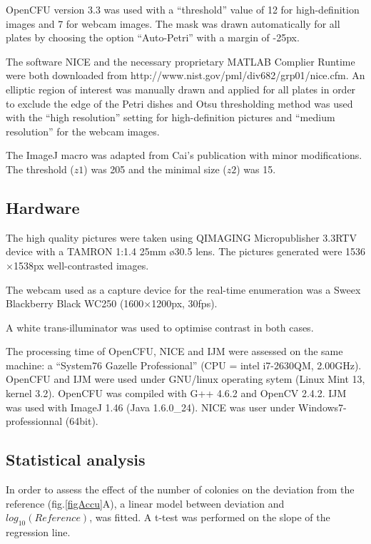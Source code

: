 \documentclass[10pt]{article}
\newcommand{\IJM}{IJM}
\begin{document}
OpenCFU version 3.3 was used with a ``threshold'' value of 12 for high-definition images and 7 for webcam images.
The mask was drawn automatically for all plates by choosing the option ``Auto-Petri'' with a margin of -25px. 

The software NICE and the necessary proprietary MATLAB Complier Runtime were both downloaded from
http://www.nist.gov/pml/div682/grp01/nice.cfm.
An elliptic region of interest was manually drawn and applied for all plates
in order to exclude the edge of the Petri dishes and Otsu thresholding method
was used with the ``high resolution'' setting for high-definition pictures and ``medium resolution'' for the webcam images.

The ImageJ macro was adapted from Cai's publication\cite{cai_optimized_2011} with minor modifications.\\
The threshold ($z1$) was 205 and the minimal size ($z2$) was 15.


\subsection*{Hardware} 
The high quality pictures were taken using QIMAGING Micropublisher 3.3RTV
device with a TAMRON 1:1.4 25mm \o 30.5 lens. The pictures generated were
1536$\times{}$1538px well-contrasted images.


The webcam used as a capture device for the real-time enumeration was a Sweex
Blackberry Black WC250 (1600$\times{}$1200px, 30fps).

A white trans-illuminator was used to optimise contrast in both cases.

The processing time of OpenCFU, NICE and \IJM{} were assessed on the same
machine: a ``System76 Gazelle Professional'' (CPU = intel i7-2630QM,
2.00GHz).
OpenCFU and \IJM{} were used under GNU/linux operating sytem (Linux Mint 13, kernel
3.2).
OpenCFU was compiled with G++ 4.6.2 and OpenCV 2.4.2.
\IJM{} was used with ImageJ 1.46 (Java 1.6.0\_24).
NICE was user under Windows7-professionnal (64bit).

\subsection*{Statistical analysis} 
In order to assess the effect of the
number of colonies on the deviation from the reference (fig.\ref{figAccu}A), a
linear model between deviation and $log_{10} (Reference)$, was fitted.  A t-test
was performed on the slope of the regression line.
\end{document}
